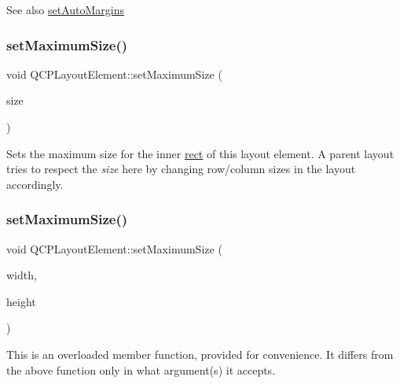 \begin{DoxySeeAlso}{See also}
\mbox{\hyperlink{class_q_c_p_layout_element_accfda49994e3e6d51ed14504abf9d27d}{set\+Auto\+Margins}} 
\end{DoxySeeAlso}
\mbox{\label{class_q_c_p_layout_element_a74eb5280a737ab44833d506db65efd95}} 
\subsubsection{\texorpdfstring{set\+Maximum\+Size()}{setMaximumSize()}\hspace{0.1cm}{\footnotesize\ttfamily [1/2]}}
{\footnotesize\ttfamily void Q\+C\+P\+Layout\+Element\+::set\+Maximum\+Size (\begin{DoxyParamCaption}\item[{const Q\+Size \&}]{size }\end{DoxyParamCaption})}

Sets the maximum size for the inner \mbox{\hyperlink{class_q_c_p_layout_element_a208effccfe2cca4a0eaf9393e60f2dd4}{rect}} of this layout element. A parent layout tries to respect the {\itshape size} here by changing row/column sizes in the layout accordingly. \mbox{\label{class_q_c_p_layout_element_a03e0e9c48f230217c529b0819f832d84}} 
\subsubsection{\texorpdfstring{set\+Maximum\+Size()}{setMaximumSize()}\hspace{0.1cm}{\footnotesize\ttfamily [2/2]}}
{\footnotesize\ttfamily void Q\+C\+P\+Layout\+Element\+::set\+Maximum\+Size (\begin{DoxyParamCaption}\item[{int}]{width,  }\item[{int}]{height }\end{DoxyParamCaption})}

This is an overloaded member function, provided for convenience. It differs from the above function only in what argument(s) it accepts.

